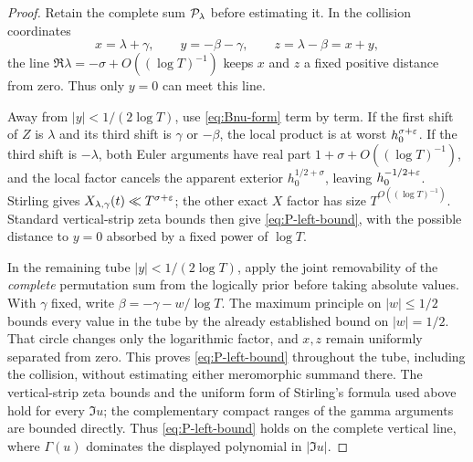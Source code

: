\begin{proof}
Retain the complete sum $\mathcal P_\lambda$ before estimating it.  In the
collision coordinates
\[
 x=\lambda+\gamma,\qquad y=-\beta-\gamma,
 \qquad z=\lambda-\beta=x+y,
\]
the line $\Re\lambda=-\sigma+O((\log T)^{-1})$ keeps $x$ and $z$ a fixed
positive distance from zero.  Thus only $y=0$ can meet this line.

Away from $|y|<1/(2\log T)$, use \eqref{eq:Bnu-form} term by term.  If the
first shift of $Z$ is $\lambda$ and its third shift is $\gamma$ or
$-\beta$, the local product is at worst $h_0^{\sigma+\varepsilon}$.  If the third
shift is $-\lambda$, both Euler arguments have real part
$1+\sigma+O((\log T)^{-1})$, and the local factor cancels the apparent
exterior $h_0^{1/2+\sigma}$, leaving $h_0^{-1/2+\varepsilon}$.  Stirling gives
$X_{\lambda,\gamma}(t)\ll T^{\sigma+\varepsilon}$; the other exact $X$ factor has
size $T^{O((\log T)^{-1})}$.  Standard vertical-strip zeta bounds then give
\eqref{eq:P-left-bound}, with the possible distance to $y=0$ absorbed by a
fixed power of $\log T$.

In the remaining tube $|y|<1/(2\log T)$, apply the joint removability of the
\emph{complete} permutation sum from the logically prior
 before taking absolute values.  With $\gamma$
fixed, write
$\beta=-\gamma-w/\log T$.  The maximum principle on $|w|\leq1/2$ bounds
every value in the tube by the already established bound on $|w|=1/2$.
That circle changes only the logarithmic factor, and $x,z$ remain uniformly
separated from zero.  This proves \eqref{eq:P-left-bound} throughout the
tube, including the collision, without estimating either meromorphic
summand there.  The vertical-strip zeta bounds and the uniform form of
Stirling's formula used above hold for every $\Im u$; the complementary
compact ranges of the gamma arguments are bounded directly.  Thus
\eqref{eq:P-left-bound} holds on the complete vertical line, where
$\Gamma(u)$ dominates the displayed polynomial in $|\Im u|$.
\end{proof}

